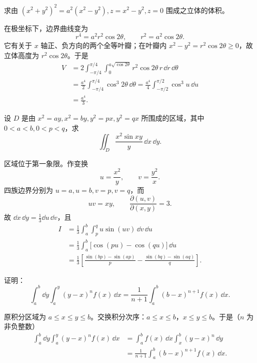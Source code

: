 \begin{xexercise}[5]
求由 $(x^2+y^2)^2=a^2(x^2-y^2),z=x^2-y^2,z=0$ 围成之立体的体积。
\end{xexercise}
\begin{xsolution}
在极坐标下，边界曲线变为
\[
  r^4=a^2r^2\cos2\theta,
  \qquad r^2=a^2\cos2\theta.
\]
它有关于 $x$ 轴正、负方向的两个全等叶瓣；在叶瓣内 $x^2-y^2=r^2\cos2\theta\ge0$，故立体高度为 $r^2\cos2\theta$。于是
\begin{align*}
 V&=2\int_{-\pi/4}^{\pi/4}\int_0^{a\sqrt{\cos2\theta}}
 r^2\cos2\theta\,r\,\dd r\,\dd\theta\\
 &=\frac{a^4}{2}\int_{-\pi/4}^{\pi/4}\cos^3 2\theta\,\dd\theta
 =\frac{a^4}{4}\int_{-\pi/2}^{\pi/2}\cos^3u\,\dd u\\
 &=\boxed{\frac{a^4}{3}}.
\end{align*}
\end{xsolution}


\begin{xexercise}[6]
设 $D$ 是由 $x^2=ay,x^2=by,y^2=px,y^2=qx$ 所围成的区域，其中 $0<a<b,0<p<q$，求
  \[
    \iint_D\frac{x^2\sin xy}{y}\,\dd x\,\dd y.
  \]
\end{xexercise}
\begin{xsolution}
区域位于第一象限。作变换
\[
  u=\frac{x^2}{y},\qquad v=\frac{y^2}{x}.
\]
四族边界分别为 $u=a,u=b,v=p,v=q$，而
\[
  uv=xy,
  \qquad
  \frac{\partial(u,v)}{\partial(x,y)}=3.
\]
故 $\dd x\,\dd y=\frac13\dd u\,\dd v$，且
\begin{align*}
 I&=\frac13\int_a^b\int_p^q u\sin(uv)\,\dd v\,\dd u\\
 &=\frac13\int_a^b\bigl[\cos(pu)-\cos(qu)\bigr]\,\dd u\\
 &=\boxed{\frac13\left[
 \frac{\sin(bp)-\sin(ap)}p-
 \frac{\sin(bq)-\sin(aq)}q\right]}.
\end{align*}
\end{xsolution}


\begin{xexercise}[7]
证明：
  \[
    \int_a^b\dd y\int_a^y(y-x)^n f(x)\,\dd x
    =\frac1{n+1}\int_a^b(b-x)^{n+1}f(x)\,\dd x.
  \]
\end{xexercise}
\begin{xsolution}
原积分区域为 $a\le x\le y\le b$。交换积分次序：$a\le x\le b$，$x\le y\le b$。于是（$n$ 为非负整数）
\begin{align*}
 \int_a^b\dd y\int_a^y(y-x)^nf(x)\,\dd x
 &=\int_a^b f(x)\,\dd x\int_x^b(y-x)^n\,\dd y\\
 &=\frac1{n+1}\int_a^b(b-x)^{n+1}f(x)\,\dd x.
\end{align*}
\end{xsolution}


